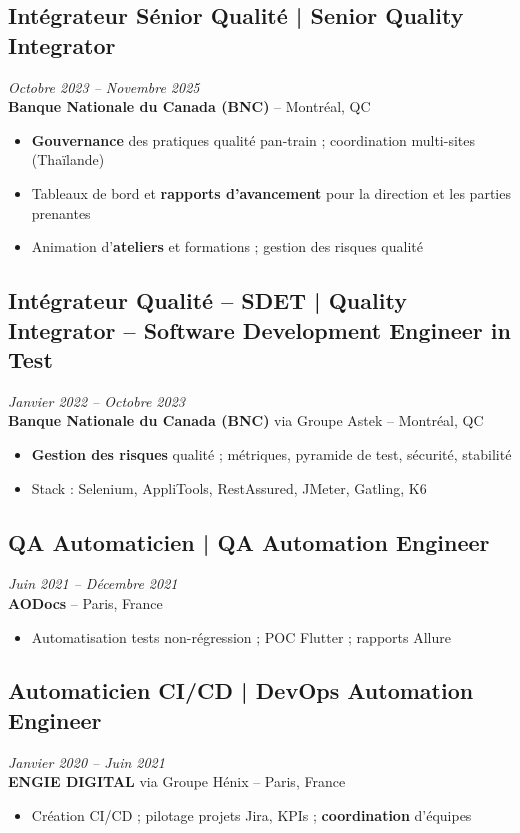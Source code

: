 \documentclass[11pt,a4paper]{article}
\begin{document}
\subsection*{Intégrateur Sénior Qualité | Senior Quality Integrator} \hfill \textit{Octobre 2023 -- Novembre 2025}\\
\textbf{Banque Nationale du Canada (BNC)} -- Montréal, QC\\
\begin{itemize}
    \item \textbf{Gouvernance} des pratiques qualité pan-train ; coordination multi-sites (Thaïlande)
    \item Tableaux de bord et \textbf{rapports d'avancement} pour la direction et les parties prenantes
    \item Animation d'\textbf{ateliers} et formations ; gestion des risques qualité
\end{itemize}

\subsection*{Intégrateur Qualité -- SDET | Quality Integrator -- Software Development Engineer in Test} \hfill \textit{Janvier 2022 -- Octobre 2023}\\
\textbf{Banque Nationale du Canada (BNC)} via Groupe Astek -- Montréal, QC\\
\begin{itemize}
    \item \textbf{Gestion des risques} qualité ; métriques, pyramide de test, sécurité, stabilité
    \item Stack : Selenium, AppliTools, RestAssured, JMeter, Gatling, K6
\end{itemize}

\subsection*{QA Automaticien | QA Automation Engineer} \hfill \textit{Juin 2021 -- Décembre 2021}\\
\textbf{AODocs} -- Paris, France\\
\begin{itemize}
    \item Automatisation tests non-régression ; POC Flutter ; rapports Allure
\end{itemize}

\subsection*{Automaticien CI/CD | DevOps Automation Engineer} \hfill \textit{Janvier 2020 -- Juin 2021}\\
\textbf{ENGIE DIGITAL} via Groupe Hénix -- Paris, France\\
\begin{itemize}
    \item Création CI/CD ; pilotage projets Jira, KPIs ; \textbf{coordination} d'équipes
\end{itemize}
\end{document}

